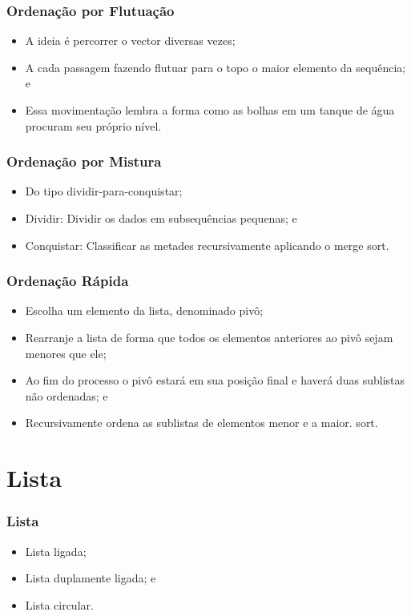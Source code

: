 \documentclass{beamer}
\begin{document}
\begin{frame}
\frametitle{Ordenação por Flutuação}

\begin{itemize}
	\item A ideia é percorrer o vector diversas vezes;
	\item A cada passagem fazendo flutuar para o topo o maior elemento da
	sequência; e
	\item Essa movimentação lembra a forma como as bolhas em um tanque de
	água procuram seu próprio nível.
\end{itemize}
\end{frame}

\begin{frame}
\frametitle{Ordenação por Mistura}

\begin{itemize}
	\item Do tipo dividir-para-conquistar;
	\item Dividir: Dividir os dados em subsequências pequenas; e
	\item Conquistar: Classificar as metades recursivamente aplicando o merge
	sort.
\end{itemize}
\end{frame}

\begin{frame}
\frametitle{Ordenação Rápida}

\begin{itemize}
	\item Escolha um elemento da lista, denominado pivô;
	\item Rearranje a lista de forma que todos os elementos anteriores ao pivô
	sejam menores que ele;
	\item Ao fim do processo o pivô estará em sua posição final e haverá duas
	sublistas não ordenadas; e
	\item Recursivamente ordena as sublistas de elementos menor e a maior.
	sort.
\end{itemize}
\end{frame}

\section{Lista}

\begin{frame}
\frametitle{Lista}

\begin{itemize}
	\item Lista ligada;
	\item Lista duplamente ligada; e
	\item Lista circular.
\end{itemize}
\end{frame}
\end{document}
